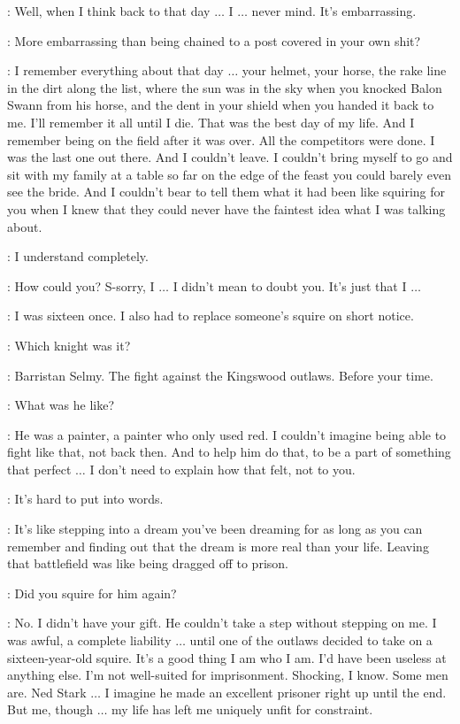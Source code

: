 \ALTON: Well, when I think back to that day $\ldots$ I $\ldots$ never mind. It's embarrassing.

\JAIME: More embarrassing than being chained to a post covered in your own shit?

\ALTON: I remember everything about that day $\ldots$ your helmet, your horse, the rake line in the dirt along the list, where the sun was in the sky when you knocked Balon Swann from his horse, and the dent in your shield when you handed it back to me. I'll remember it all until I die. That was the best day of my life. And I remember being on the field after it was over. All the competitors were done. I was the last one out there. And I couldn't leave. I couldn't bring myself to go and sit with my family at a table so far on the edge of the feast you could barely even see the bride. And I couldn't bear to tell them what it had been like squiring for you when I knew that they could never have the faintest idea what I was talking about.

\JAIME: I understand completely.

\ALTON: How could you? S-sorry, I $\ldots$ I didn't mean to doubt you. It's just that I $\ldots$

\JAIME: I was sixteen once. I also had to replace someone's squire on short notice.

\ALTON: Which knight was it?

\JAIME: Barristan Selmy. The fight against the Kingswood outlaws. Before your time.

\ALTON: What was he like?

\JAIME: He was a painter, a painter who only used red. I couldn't imagine being able to fight like that, not back then. And to help him do that, to be a part of something that perfect $\ldots$ I don't need to explain how that felt, not to you.

\ALTON: It's hard to put into words.

\JAIME: It's like stepping into a dream you've been dreaming for as long as you can remember and finding out that the dream is more real than your life. Leaving that battlefield was like being dragged off to prison.

\ALTON: Did you squire for him again?

\JAIME: No. I didn't have your gift. He couldn't take a step without stepping on me. I was awful, a complete liability $\ldots$ until one of the outlaws decided to take on a sixteen-year-old squire. It's a good thing I am who I am. I'd have been useless at anything else. I'm not well-suited for imprisonment. Shocking, I know. Some men are. Ned Stark $\ldots$ I imagine he made an excellent prisoner right up until the end. But me, though $\ldots$ my life has left me uniquely unfit for constraint.

